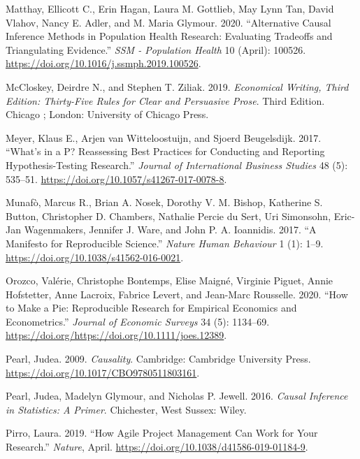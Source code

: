 \documentclass[
]{book}
\begin{document}
\leavevmode\hypertarget{ref-matthay_alternative_2020}{}%
Matthay, Ellicott C., Erin Hagan, Laura M. Gottlieb, May Lynn Tan, David
Vlahov, Nancy E. Adler, and M. Maria Glymour. 2020. ``Alternative Causal
Inference Methods in Population Health Research: Evaluating Tradeoffs
and Triangulating Evidence.'' \emph{SSM - Population Health} 10 (April):
100526. \url{https://doi.org/10.1016/j.ssmph.2019.100526}.

\leavevmode\hypertarget{ref-mccloskey_economical_2019}{}%
McCloskey, Deirdre N., and Stephen T. Ziliak. 2019. \emph{Economical
Writing, Third Edition: Thirty-Five Rules for Clear and Persuasive
Prose}. Third Edition. Chicago ; London: University of Chicago Press.

\leavevmode\hypertarget{ref-meyer_whats_2017}{}%
Meyer, Klaus E., Arjen van Witteloostuijn, and Sjoerd Beugelsdijk. 2017.
``What's in a P? Reassessing Best Practices for Conducting and Reporting
Hypothesis-Testing Research.'' \emph{Journal of International Business
Studies} 48 (5): 535--51.
\url{https://doi.org/10.1057/s41267-017-0078-8}.

\leavevmode\hypertarget{ref-munafo_manifesto_2017}{}%
Munafò, Marcus R., Brian A. Nosek, Dorothy V. M. Bishop, Katherine S.
Button, Christopher D. Chambers, Nathalie Percie du Sert, Uri Simonsohn,
Eric-Jan Wagenmakers, Jennifer J. Ware, and John P. A. Ioannidis. 2017.
``A Manifesto for Reproducible Science.'' \emph{Nature Human Behaviour}
1 (1): 1--9. \url{https://doi.org/10.1038/s41562-016-0021}.

\leavevmode\hypertarget{ref-orozco_how_2020}{}%
Orozco, Valérie, Christophe Bontemps, Elise Maigné, Virginie Piguet,
Annie Hofstetter, Anne Lacroix, Fabrice Levert, and Jean-Marc Rousselle.
2020. ``How to Make a Pie: Reproducible Research for Empirical Economics
and Econometrics.'' \emph{Journal of Economic Surveys} 34 (5): 1134--69.
\url{https://doi.org/https://doi.org/10.1111/joes.12389}.

\leavevmode\hypertarget{ref-pearl_causality_2009}{}%
Pearl, Judea. 2009. \emph{Causality}. Cambridge: Cambridge University
Press. \url{https://doi.org/10.1017/CBO9780511803161}.

\leavevmode\hypertarget{ref-pearl_causal_2016}{}%
Pearl, Judea, Madelyn Glymour, and Nicholas P. Jewell. 2016.
\emph{Causal Inference in Statistics: A Primer}. Chichester, West
Sussex: Wiley.

\leavevmode\hypertarget{ref-pirro_how_2019}{}%
Pirro, Laura. 2019. ``How Agile Project Management Can Work for Your
Research.'' \emph{Nature}, April.
\url{https://doi.org/10.1038/d41586-019-01184-9}.
\end{document}
